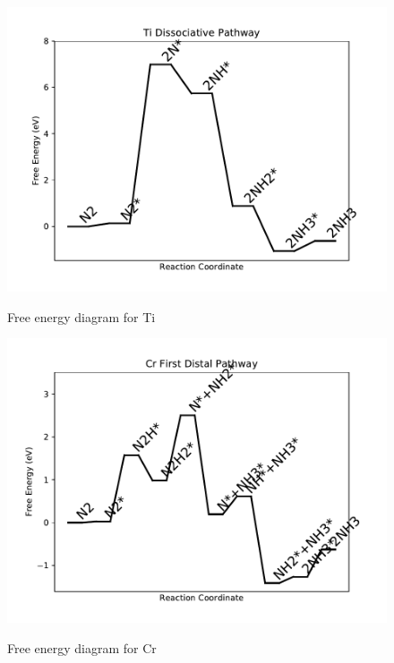\documentclass{article}
\begin{document}
\begin{figure}
\includegraphics[width=1\linewidth]{data/plots/Ti_dissociative.pdf}
\label{fig:Ti_dissociative}
\caption{Free energy diagram for Ti}
\end{figure}

\clearpage
\begin{figure}
\includegraphics[width=1\linewidth]{data/plots/Cr_distal_1.pdf}
\label{fig:Cr_distal_1}
\caption{Free energy diagram for Cr}
\end{figure}
\end{document}
